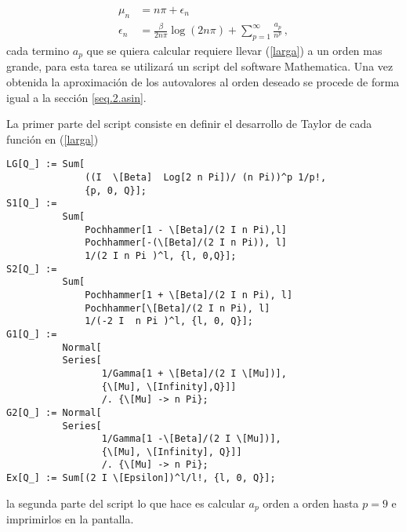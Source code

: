 \begin{equation}
\begin{aligned}
\mu _n  &= 
			n \pi + \epsilon _n \\
			\epsilon _n &= 
			\frac{ \beta }{2 n \pi } \log (2 n \pi) +
			\sum _{p=1} ^{\infty} \frac{a _p}{n ^p }
			\, ,
\end{aligned}
\end{equation}
cada termino $a_p$ que se quiera calcular requiere llevar (\ref{larga}) a un orden mas grande, para esta tarea se utilizará un script del software Mathematica. Una vez obtenida la aproximación de los autovalores al orden deseado se procede de forma igual a la sección \ref{seq.2.asin}.


La primer parte del script consiste en definir el desarrollo de Taylor de cada función  en (\ref{larga})
\begin{verbatim}
LG[Q_] := Sum[
              ((I  \[Beta]  Log[2 n Pi])/ (n Pi))^p 1/p!, 
              {p, 0, Q}];
S1[Q_] := 
          Sum[
              Pochhammer[1 - \[Beta]/(2 I n Pi),l] 
              Pochhammer[-(\[Beta]/(2 I n Pi)), l] 
              1/(2 I n Pi )^l, {l, 0,Q}];
S2[Q_] := 
          Sum[
              Pochhammer[1 + \[Beta]/(2 I n Pi), l] 
              Pochhammer[\[Beta]/(2 I n Pi), l] 
              1/(-2 I  n Pi )^l, {l, 0, Q}];
G1[Q_] := 
          Normal[
          Series[
                 1/Gamma[1 + \[Beta]/(2 I \[Mu])], 
                 {\[Mu], \[Infinity],Q}]] 
                 /. {\[Mu] -> n Pi};
G2[Q_] := Normal[
          Series[
                 1/Gamma[1 -\[Beta]/(2 I \[Mu])], 
                 {\[Mu], \[Infinity], Q}]] 
                 /. {\[Mu] -> n Pi};
Ex[Q_] := Sum[(2 I \[Epsilon])^l/l!, {l, 0, Q}];
\end{verbatim}
la segunda parte del script lo que hace es calcular $a_p$ orden a orden hasta $p=9$ e imprimirlos en la pantalla.

